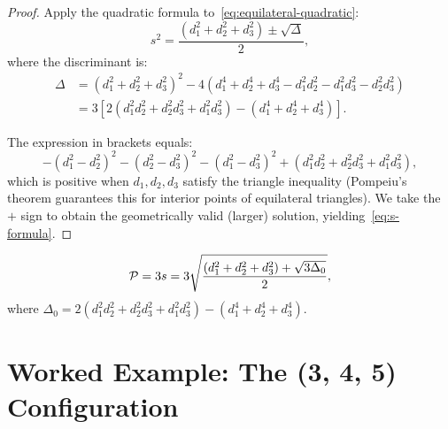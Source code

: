 \begin{proof}
Apply the quadratic formula to~\eqref{eq:equilateral-quadratic}:
\begin{equation}
s^2 = \frac{(d_1^2 + d_2^2 + d_3^2) \pm \sqrt{\Delta}}{2},
\end{equation}
where the discriminant is:
\begin{align}
\Delta &= (d_1^2 + d_2^2 + d_3^2)^2 - 4(d_1^4 + d_2^4 + d_3^4 - d_1^2 d_2^2 - d_1^2 d_3^2 - d_2^2 d_3^2) \\
&= 3\left[2(d_1^2 d_2^2 + d_2^2 d_3^2 + d_1^2 d_3^2) - (d_1^4 + d_2^4 + d_3^4)\right].
\end{align}

The expression in brackets equals:
\begin{equation}
-(d_1^2 - d_2^2)^2 - (d_2^2 - d_3^2)^2 - (d_1^2 - d_3^2)^2 + (d_1^2 d_2^2 + d_2^2 d_3^2 + d_1^2 d_3^2),
\end{equation}
which is positive when $d_1, d_2, d_3$ satisfy the triangle inequality (Pompeiu's theorem guarantees this for interior points of equilateral triangles). We take the $+$ sign to obtain the geometrically valid (larger) solution, yielding~\eqref{eq:s-formula}.
\end{proof}

\begin{corollary}
\begin{equation}
\mathcal{P} = 3s = 3\sqrt{\frac{(d_1^2 + d_2^2 + d_3^2) + \sqrt{3\Delta_0}}{2}},
\end{equation}
where $\Delta_0 = 2(d_1^2 d_2^2 + d_2^2 d_3^2 + d_1^2 d_3^2) - (d_1^4 + d_2^4 + d_3^4)$.
\end{corollary}

\section{Worked Example: The (3, 4, 5) Configuration}

